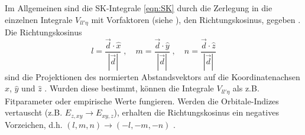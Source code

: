 Im Allgemeinen sind die SK-Integrale \eqref{eqn:SK} durch die Zerlegung in die einzelnen Integrale $V_{ll'\eta}$ mit Vorfaktoren (siehe \cite{PhysRev.94.1498}),
den Richtungskosinus, gegeben \cite{SC_literature}.
Die Richtungskosinus 
\begin{equation}
    l = \frac{\vec{d} \cdot \hat{x}}{\left | \vec{d} \right |} \; , \quad
    m = \frac{\vec{d} \cdot \hat{y}}{\left | \vec{d} \right |} \; , \quad
    n = \frac{\vec{d} \cdot \hat{z}}{\left | \vec{d} \right |} \label{eqn:RK}
\end{equation}
sind die Projektionen des normierten Abstandsvektors auf die Koordinatenachsen $\hat{x}$, $\hat{y}$ und $\hat{z}$ \cite{SC_literature}.
Wurden diese bestimmt, können die Integrale $V_{ll'\eta}$ als z.B. Fitparameter oder empirische Werte fungieren. 
Werden die Orbitale-Indizes vertauscht (z.B. $E_{z,xy} \to E_{xy, z}$), erhalten die Richtungskosinus ein negatives Vorzeichen, d.h. $(l,m,n) \to (-l,-m,-n)$ \cite{PhysRev.94.1498}.